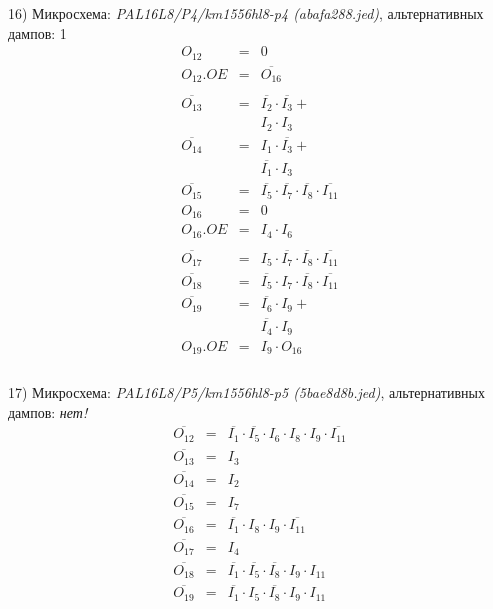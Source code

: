 \documentclass[a4paper,russian]{report}
\begin{document}
16) Микросхема: \emph{PAL16L8/P4/km1556hl8-p4  (abafa288.jed)}, альтернативных дампов: 1
\nopagebreak\begin{eqnarray*}
    O_{12} & = & 0 \\
    O_{12}.OE & = & \overline{O_{16}} \\ \\
    \overline{O_{13}} & = & \overline{I_{2}} \cdotp \overline{I_{3}} + \\
	& &  I_{2} \cdotp I_{3} \\
    \overline{O_{14}} & = & I_{1} \cdotp \overline{I_{3}} + \\
	& &  \overline{I_{1}} \cdotp I_{3} \\
    \overline{O_{15}} & = & \overline{I_{5}} \cdotp \overline{I_{7}} \cdotp \overline{I_{8}} \cdotp \overline{I_{11}} \\
    O_{16} & = & 0 \\
    O_{16}.OE & = & I_{4} \cdotp I_{6} \\ \\
    \overline{O_{17}} & = & I_{5} \cdotp \overline{I_{7}} \cdotp \overline{I_{8}} \cdotp \overline{I_{11}} \\
    \overline{O_{18}} & = & \overline{I_{5}} \cdotp I_{7} \cdotp \overline{I_{8}} \cdotp \overline{I_{11}} \\
    \overline{O_{19}} & = & \overline{I_{6}} \cdotp I_{9} + \\
	& &  \overline{I_{4}} \cdotp I_{9} \\
    O_{19}.OE & = & I_{9} \cdotp O_{16} \\ \\
 \end{eqnarray*}
\pagebreak[1]


17) Микросхема: \emph{PAL16L8/P5/km1556hl8-p5  (5bae8d8b.jed)}, альтернативных дампов: \emph{нет!}
\nopagebreak\begin{eqnarray*}
    \overline{O_{12}} & = & \overline{I_{1}} \cdotp \overline{I_{5}} \cdotp I_{6} \cdotp I_{8} \cdotp I_{9} \cdotp \overline{I_{11}} \\
    \overline{O_{13}} & = & I_{3} \\
    \overline{O_{14}} & = & I_{2} \\
    \overline{O_{15}} & = & I_{7} \\
    \overline{O_{16}} & = & \overline{I_{1}} \cdotp I_{8} \cdotp I_{9} \cdotp \overline{I_{11}} \\
    \overline{O_{17}} & = & I_{4} \\
    \overline{O_{18}} & = & \overline{I_{1}} \cdotp \overline{I_{5}} \cdotp \overline{I_{8}} \cdotp I_{9} \cdotp I_{11} \\
    \overline{O_{19}} & = & \overline{I_{1}} \cdotp I_{5} \cdotp \overline{I_{8}} \cdotp I_{9} \cdotp I_{11} \\
 \end{eqnarray*}
\pagebreak[1]
\end{document}
